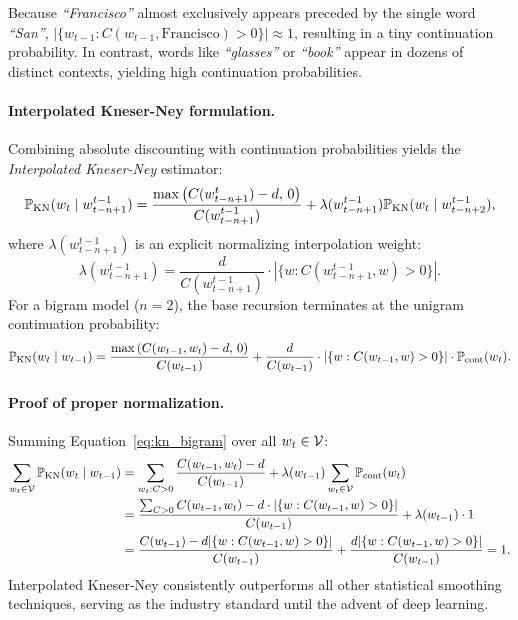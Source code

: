 \documentclass[../../main.tex]{subfiles}
\begin{document}
Because \textit{``Francisco''} almost exclusively appears preceded by the single word \textit{``San''}, $|\{ w_{t-1} : C(w_{t-1}, \text{Francisco}) > 0 \}| \approx 1$, resulting in a tiny continuation probability. In contrast, words like \textit{``glasses''} or \textit{``book''} appear in dozens of distinct contexts, yielding high continuation probabilities.

\paragraph{Interpolated Kneser-Ney formulation.}
Combining absolute discounting with continuation probabilities yields the \emph{Interpolated Kneser-Ney} estimator:
\begin{equation}
\label{eq:kneser_ney}
\mathbb{P}_{\text{KN}}(w_t \mid w_{t-n+1}^{t-1}) = \frac{\max\left( C(w_{t-n+1}^t) - d, \, 0 \right)}{C(w_{t-n+1}^{t-1})} + \lambda(w_{t-n+1}^{t-1}) \mathbb{P}_{\text{KN}}(w_t \mid w_{t-n+2}^{t-1}),
\end{equation}
where $\lambda(w_{t-n+1}^{t-1})$ is an explicit normalizing interpolation weight:
\begin{equation}
\label{eq:kn_lambda}
\lambda(w_{t-n+1}^{t-1}) = \frac{d}{C(w_{t-n+1}^{t-1})} \cdot \left| \{ w : C(w_{t-n+1}^{t-1}, w) > 0 \} \right|.
\end{equation}
For a bigram model ($n=2$), the base recursion terminates at the unigram continuation probability:
\begin{equation}
\label{eq:kn_bigram}
\mathbb{P}_{\text{KN}}(w_t \mid w_{t-1}) = \frac{\max\left( C(w_{t-1}, w_t) - d, \, 0 \right)}{C(w_{t-1})} + \frac{d}{C(w_{t-1})} \cdot \left| \{ w : C(w_{t-1}, w) > 0 \} \right| \cdot \mathbb{P}_{\text{cont}}(w_t).
\end{equation}

\paragraph{Proof of proper normalization.}
Summing Equation~\eqref{eq:kn_bigram} over all $w_t \in \mathcal{V}$:
\begin{align}
\sum_{w_t \in \mathcal{V}} \mathbb{P}_{\text{KN}}(w_t \mid w_{t-1}) &= \sum_{w_t : C > 0} \frac{C(w_{t-1}, w_t) - d}{C(w_{t-1})} + \lambda(w_{t-1}) \sum_{w_t \in \mathcal{V}} \mathbb{P}_{\text{cont}}(w_t) \notag \\
&= \frac{\sum_{C > 0} C(w_{t-1}, w_t) - d \cdot |\{ w : C(w_{t-1}, w) > 0 \}|}{C(w_{t-1})} + \lambda(w_{t-1}) \cdot 1 \notag \\
&= \frac{C(w_{t-1}) - d |\{ w : C(w_{t-1}, w) > 0 \}|}{C(w_{t-1})} + \frac{d |\{ w : C(w_{t-1}, w) > 0 \}|}{C(w_{t-1})} = 1. \label{eq:kn_proof}
\end{align}
Interpolated Kneser-Ney consistently outperforms all other statistical smoothing techniques, serving as the industry standard until the advent of deep learning.
\end{document}
